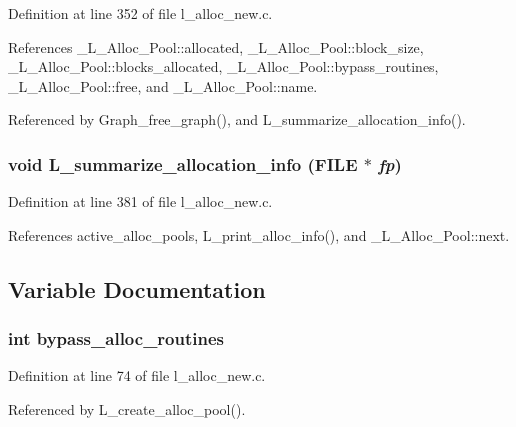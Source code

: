 Definition at line 352 of file l\_\-alloc\_\-new.c.

References \_\-L\_\-Alloc\_\-Pool::allocated, \_\-L\_\-Alloc\_\-Pool::block\_\-size, \_\-L\_\-Alloc\_\-Pool::blocks\_\-allocated, \_\-L\_\-Alloc\_\-Pool::bypass\_\-routines, \_\-L\_\-Alloc\_\-Pool::free, and \_\-L\_\-Alloc\_\-Pool::name.

Referenced by Graph\_\-free\_\-graph(), and L\_\-summarize\_\-allocation\_\-info().
\subsubsection{\setlength{\rightskip}{0pt plus 5cm}void L\_\-summarize\_\-allocation\_\-info (FILE $\ast$ {\em fp})}\label{l__alloc__new_8h_f1a7e407007f958a74e86a023a071642}




Definition at line 381 of file l\_\-alloc\_\-new.c.

References active\_\-alloc\_\-pools, L\_\-print\_\-alloc\_\-info(), and \_\-L\_\-Alloc\_\-Pool::next.

\subsection{Variable Documentation}
\subsubsection{\setlength{\rightskip}{0pt plus 5cm}int \bf{bypass\_\-alloc\_\-routines}}\label{l__alloc__new_8h_a3b32dfd5d5c937e01c07ffd52c4ecda}




Definition at line 74 of file l\_\-alloc\_\-new.c.

Referenced by L\_\-create\_\-alloc\_\-pool().